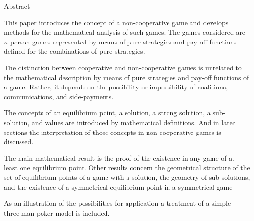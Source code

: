 \begin{titlepage}
    \begin{center}
        \large Abstract
    \end{center}
 
        \normalsize
        This paper introduces the concept of a non-cooperative game and develops methods for the mathematical analysis of such games. The games considered are $n$-person games represented by means of pure strategies and pay-off functions defined for the combinations of pure strategies.	

        The distinction between cooperative and non-cooperative games is unrelated to the mathematical description by means of pure strategies and pay-off functions of a game. Rather, it depends on the possibility or impossibility of coalitions, communications, and side-payments.

        The concepts of an equilibrium point, a solution, a strong solution, a sub-solution, and values are introduced by mathematical definitions. And in later sections the interpretation of those concepts in non-cooperative games is discussed.

        The main mathematical result is the proof of the existence in any game of at least one equilibrium point. Other results concern the geometrical structure of the set of equilibrium points of a game with a solution, the geometry of sub-solutions, and the existence of a symmetrical equilibrium point in a symmetrical game.

        As an illustration of the possibilities for application a treatment of a simple three-man poker model is included.
\end{titlepage}
